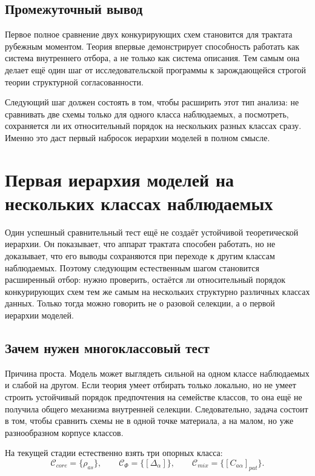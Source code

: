 \documentclass[12pt,a4paper]{article}
\begin{document}
\subsection{Промежуточный вывод}

Первое полное сравнение двух конкурирующих схем становится для трактата рубежным моментом. Теория впервые демонстрирует способность работать как система внутреннего отбора, а не только как система описания. Тем самым она делает ещё один шаг от исследовательской программы к зарождающейся строгой теории структурной согласованности.

Следующий шаг должен состоять в том, чтобы расширить этот тип анализа: не сравнивать две схемы только для одного класса наблюдаемых, а посмотреть, сохраняется ли их относительный порядок на нескольких разных классах сразу. Именно это даст первый набросок иерархии моделей в полном смысле.


\section{Первая иерархия моделей на нескольких классах наблюдаемых}

Один успешный сравнительный тест ещё не создаёт устойчивой теоретической иерархии. Он показывает, что аппарат трактата способен работать, но не доказывает, что его выводы сохраняются при переходе к другим классам наблюдаемых. Поэтому следующим естественным шагом становится расширенный отбор: нужно проверить, остаётся ли относительный порядок конкурирующих схем тем же самым на нескольких структурно различных классах данных. Только тогда можно говорить не о разовой селекции, а о первой иерархии моделей.

\subsection{Зачем нужен многоклассовый тест}

Причина проста. Модель может выглядеть сильной на одном классе наблюдаемых и слабой на другом. Если теория умеет отбирать только локально, но не умеет строить устойчивый порядок предпочтения на семействе классов, то она ещё не получила общего механизма внутренней селекции. Следовательно, задача состоит в том, чтобы сравнить схемы не в одной точке материала, а на малом, но уже разнообразном корпусе классов.

На текущей стадии естественно взять три опорных класса:
\begin{equation}
\mathcal{C}_{core} = \{\rho_{as}\},
\qquad
\mathcal{C}_{\Phi} = \{[\Delta_{\alpha}]\},
\qquad
\mathcal{C}_{mix} = \{[C_{a\alpha}]_{pat}\}.
\end{equation}
\end{document}
